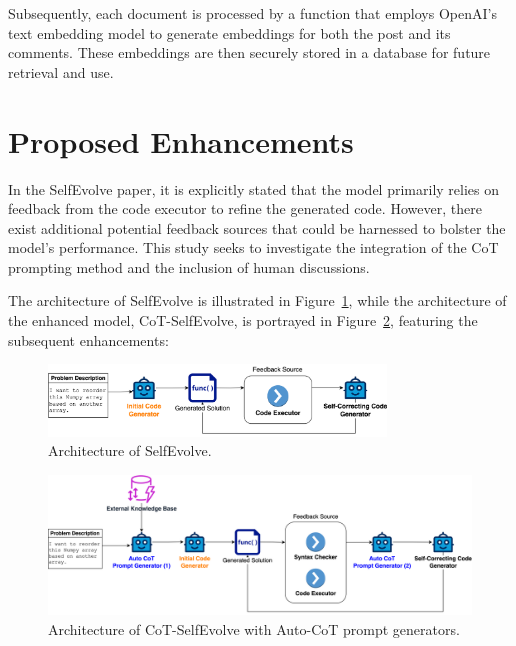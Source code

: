 \documentclass[a4paper,oneside]{book}
\begin{document}
Subsequently, each document is processed by a function that employs OpenAI's text embedding model to generate embeddings for both the post and its comments. These embeddings are then securely stored in a database for future retrieval and use.

\section{Proposed Enhancements}
In the SelfEvolve paper, it is explicitly stated that the model primarily relies on feedback from the code executor to refine the generated code. However, there exist additional potential feedback sources that could be harnessed to bolster the model's performance. This study seeks to investigate the integration of the CoT prompting method and the inclusion of human discussions.

The architecture of SelfEvolve is illustrated in Figure~\ref{fig:selfevolve_architecture}, while the architecture of the enhanced model, CoT-SelfEvolve, is portrayed in Figure~\ref{fig:cot_selfevolve_architecture}, featuring the subsequent enhancements:

\newpage
\begin{figure}[H]
    \centering
    \includegraphics[width=0.8\textwidth]{img/selfevolve_architecture}
    \caption{Architecture of SelfEvolve.}\label{fig:selfevolve_architecture}
\end{figure}

\begin{figure}[H]
    \centering
    \includegraphics[width=1.0\textwidth]{img/cot_selfevolve_architecture}
    \caption{Architecture of CoT-SelfEvolve with Auto-CoT prompt generators.}\label{fig:cot_selfevolve_architecture}
\end{figure}
\end{document}
